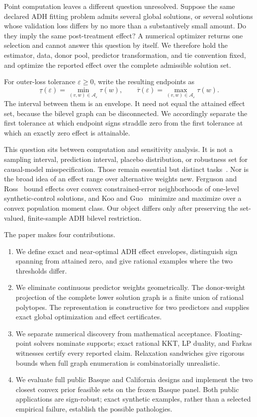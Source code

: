 \documentclass[10pt]{article}
\theoremstyle{definition}
\newcommand{\cA}{\mathcal A}
\newcommand{\eps}{\varepsilon}
\begin{document}
Point computation leaves a different question unresolved.  Suppose the same
declared ADH fitting problem admits several global solutions, or several
solutions whose validation loss differs by no more than a substantively small
amount.  Do they imply the same post-treatment effect?  A numerical optimizer
returns one selection and cannot answer this question by itself.  We therefore
hold the estimator, data, donor pool, predictor transformation, and tie
convention fixed, and optimize the reported effect over the complete admissible
solution set.

For outer-loss tolerance $\eps\ge0$, write the resulting endpoints as
\[
  \underline\tau(\eps)=\min_{(v,w)\in\cA_\eps}\tau(w),\qquad
  \overline\tau(\eps)=\max_{(v,w)\in\cA_\eps}\tau(w).
\]
The interval between them is an envelope.  It need not equal the attained
effect set, because the bilevel graph can be disconnected.  We accordingly
separate the first tolerance at which endpoint signs straddle zero from the
first tolerance at which an exactly zero effect is attainable.

This question sits between computation and sensitivity analysis.  It is not a
sampling interval, prediction interval, placebo distribution, or robustness
set for causal-model misspecification.  Those remain essential but distinct
tasks~\cite{firpopossebom2018,cattaneo2021,fermanpinto2021}.  Nor is the broad
idea of an effect range over alternative weights new.  Ferguson and
Ross~\cite{fergusonross2021} bound effects over convex constrained-error
neighborhoods of one-level synthetic-control solutions, and Koo and
Guo~\cite{kooguo2026} minimize and maximize over a convex population moment
class.  Our object differs only after preserving the set-valued, finite-sample
ADH bilevel restriction.

The paper makes four contributions.

\begin{enumerate}
\item We define exact and near-optimal ADH effect envelopes, distinguish sign
spanning from attained zero, and give rational examples where the two
thresholds differ.
\item We eliminate continuous predictor weights geometrically.  The
donor-weight projection of the complete lower solution graph is a finite union
of rational polytopes.  The representation is constructive for two predictors
and supplies exact global optimization and effect certificates.
\item We separate numerical discovery from mathematical acceptance.  Floating-
point solvers nominate supports; exact rational KKT, LP duality, and Farkas
witnesses certify every reported claim.  Relaxation sandwiches give rigorous
bounds when full graph enumeration is combinatorially unrealistic.
\item We evaluate full public Basque and California designs and implement the
two closest convex prior feasible sets on the frozen Basque panel.  Both public
applications are sign-robust; exact synthetic examples, rather than a selected
empirical failure, establish the possible pathologies.
\end{enumerate}
\end{document}
